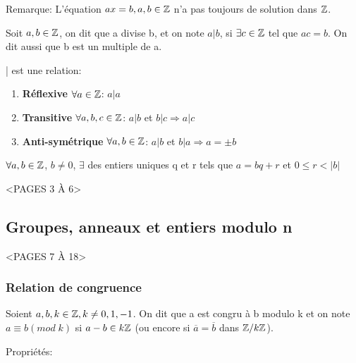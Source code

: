Remarque: L'équation $ax = b, a,b\in \mathbb{Z}$ n'a pas toujours de solution dans $\mathbb{Z}$.\\

\begin{defn}
Soit $a,b \in \mathbb{Z}$, on dit que a divise b, et on note $a|b$, si $\exists c \in \mathbb{Z}$ tel que $ac=b$. On dit aussi que b est un multiple de a.
\end{defn}

\begin{prop}
| est une relation:

\begin{enumerate}
	\item \textbf{Réflexive} $\forall a \in \mathbb{Z}$: $a|a$
	\item \textbf{Transitive} $\forall a,b,c \in \mathbb{Z}$: $a|b$ et $b|c \Rightarrow a|c$
	\item \textbf{Anti-symétrique} $\forall a,b \in \mathbb{Z}$: $a|b$ et $b|a \Rightarrow a=\pm b$
\end{enumerate}
\end{prop}

\begin{thrm}
$\forall a,b \in \mathbb{Z}$, $b \neq 0$, $\exists$ des entiers uniques q et r tels que $a= bq + r$ et $0 \leq r < |b|$
\end{thrm}

<PAGES 3 À 6>

\subsection{Groupes, anneaux et entiers modulo n}

<PAGES 7 À 18>

\subsubsection{Relation de congruence}

\begin{defn}
Soient $a,b,k \in \mathbb{Z}, k \neq 0,1,-1$. On dit que a est congru à b modulo k et on note $a \equiv b(mod\;k)$ si $a-b \in k\mathbb{Z}$ (ou encore si $\overline{a} = \overline{b}$ dans $\mathbb{Z}/k\mathbb{Z}$). \\
\end{defn}

Propriétés:

